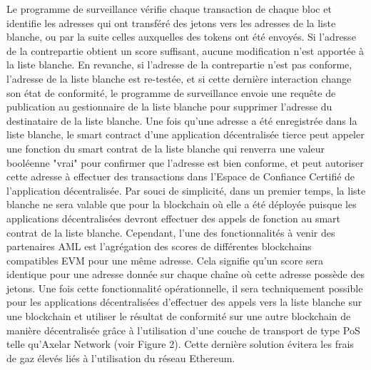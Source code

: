 ﻿\documentclass[a4paper]{article}
\begin{document}
Le programme de surveillance vérifie chaque transaction de chaque bloc et identifie les adresses qui ont transféré des jetons vers les adresses de la liste blanche, ou par la suite celles auxquelles des tokens ont été envoyés. Si l'adresse de la contrepartie obtient un score suffisant, aucune modification n'est apportée à la liste blanche. En revanche, si l'adresse de la contrepartie n'est pas conforme, l'adresse de la liste blanche est re-testée, et si cette dernière interaction change son état de conformité, le programme de surveillance envoie une requête de publication au gestionnaire de la liste blanche pour supprimer l'adresse du destinataire de la liste blanche.
Une fois qu'une adresse a été enregistrée dans la liste blanche, le smart contract d’une application décentralisée tierce peut appeler une fonction du smart contrat de la liste blanche qui renverra une valeur booléenne "vrai" pour confirmer que l'adresse est bien conforme, et peut autoriser cette adresse à effectuer des transactions dans l’Espace de Confiance Certifié de l’application décentralisée.
Par souci de simplicité, dans un premier temps, la liste blanche ne sera valable que pour la blockchain où elle a été déployée puisque les applications décentralisées devront effectuer des appels de fonction au smart contrat de la liste blanche. Cependant, l'une des fonctionnalités à venir des partenaires AML est l'agrégation des scores de différentes blockchains compatibles EVM pour une même adresse. Cela signifie qu'un score sera identique pour une adresse donnée sur chaque chaîne où cette adresse possède des jetons. Une fois cette fonctionnalité opérationnelle, il sera techniquement possible pour les applications décentralisées d’effectuer des appels vers la liste blanche sur une blockchain et utiliser le résultat de conformité sur une autre blockchain de manière décentralisée grâce à l'utilisation d'une couche de transport de type PoS telle qu'Axelar Network (voir Figure 2). 
Cette dernière solution évitera les frais de gaz élevés liés à l'utilisation du réseau Ethereum. \\
\end{document}
